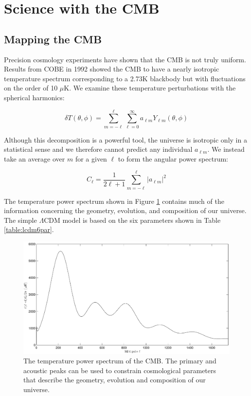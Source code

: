 \documentclass[12pt]{article}
\begin{document}
\section{Science with the CMB}

\subsection{Mapping the CMB}
Precision cosmology experiments have shown that the CMB is not truly uniform.
Results from COBE in 1992\cite{cite:COBE} showed the CMB to have a nearly
isotropic temperature spectrum corresponding to a 2.73K blackbody but with
fluctuations on the order of 10 $\mu$K. We examine these temperature
perturbations with the spherical harmonics:


\begin{equation}
	\delta T(\theta,\phi) = \sum _{m=-\ell} ^\ell \sum _{\ell=0} ^\infty
	a_{\ell m}Y_{\ell m}(\theta,\phi)
\end{equation}


Although this decomposition is a powerful tool, the universe is isotropic only
in a statistical sense and we therefore cannot predict any individual $a_{\ell
m}$. We instead take an average over $m$ for a given $\ell$ to form the
angular power spectrum:

\begin{equation}
	C_{\ell} = \frac{1}{2\ell +1}\sum _{m=-\ell} ^\ell |a_{\ell m}|^2
\end{equation}


The temperature power spectrum shown in Figure \ref{fig:temp_aps} contains
much of the information concerning the geometry, evolution, and composition of
our universe. The simple $\Lambda$CDM model is based on the six parameters
shown in Table \ref{table:lcdm6par}. 
\begin{figure}
	\center
	\includegraphics[width=\textwidth]{temp_aps.pdf}
	\caption{The temperature power spectrum of the CMB. The primary and
	acoustic peaks can be used to constrain cosmological parameters that
	describe the geometry, evolution and composition of our universe.}
	\label{fig:temp_aps}

\end{figure}
\end{document}
